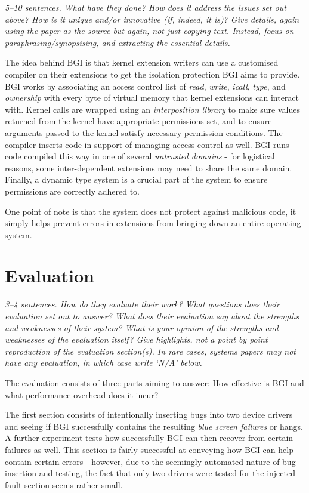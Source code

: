 \documentclass[11pt]{article}
\begin{document}
\textsl{5--10 sentences. What have they done? How does it address the issues
set out above? How is it unique and/or innovative (if, indeed, it is)? Give
details, again using the paper as the source but again, not just copying text.
Instead, focus on paraphrasing/synopsising, and extracting the essential
details.}

The idea behind BGI is that kernel extension writers can use a customised
compiler on their extensions to get the isolation protection BGI aims to
provide. BGI works by associating an access control list of \textit{read},
\textit{write}, \textit{icall}, \textit{type}, and \textit{ownership} with
every byte of virtual memory that kernel extensions can interact with. Kernel
calls are wrapped using an \textit{interposition library} to make sure values
returned from the kernel have appropriate permissions set, and to ensure
arguments passed to the kernel satisfy necessary permission conditions. The
compiler inserts code in support of managing access control as well. BGI runs
code compiled this way in one of several \textit{untrusted domains} - for
logistical reasons, some inter-dependent extensions may need to share the same
domain. Finally, a dynamic type system is a crucial part of the system to
ensure permissions are correctly adhered to.

One point of note is that the system does not protect against malicious code,
it simply helps prevent errors in extensions from bringing down an entire
operating system.

\section*{Evaluation}

\textsl{3--4 sentences. How do they evaluate their work? What questions does
their evaluation set out to answer? What does their evaluation say about the
strengths and weaknesses of their system? What is your opinion of the strengths
and weaknesses of the evaluation itself? Give highlights, not a point by point
reproduction of the evaluation section(s). In rare cases, systems papers may
not have any evaluation, in which case write `N/A' below.}

The evaluation consists of three parts aiming to answer: How effective is BGI and
what performance overhead does it incur?

The first section consists of intentionally inserting bugs into two device
drivers and seeing if BGI successfully contains the resulting \textit{blue
screen failures} or hangs. A further experiment tests how successfully BGI can
then recover from certain failures as well. This section is fairly successful
at conveying how BGI can help contain certain errors - however, due to the
seemingly automated nature of bug-insertion and testing, the fact that only two
drivers were tested for the injected-fault section seems rather small.
\end{document}
